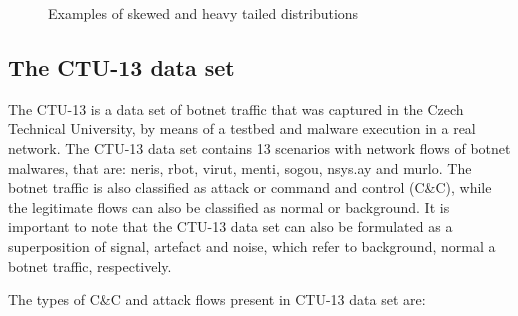 \begin{figure}[!htb]
	\centering
	\caption[Examples of skewed and heavy tailed distributions]{Examples of skewed and heavy tailed distributions}
	\label{fig:4.03}
\end{figure}

\subsection{The CTU-13 data set}
\label{sec:4_CTU-13}

The CTU-13 \cite{garcia2014empirical} is a data set of botnet traffic that was captured in the Czech Technical University, by means of a testbed and malware execution in a real network. The CTU-13 data set contains 13 scenarios with network flows of botnet malwares, that are: neris, rbot, virut, menti, sogou, nsys.ay and murlo. The botnet traffic is also classified as attack or command and control (C\&C), while the legitimate flows can also be classified as normal or background. It is important to note that the CTU-13 data set can also be formulated as a superposition of signal, artefact and noise, which refer to background, normal a botnet traffic, respectively.

The types of C\&C and attack flows present in CTU-13 data set are:

